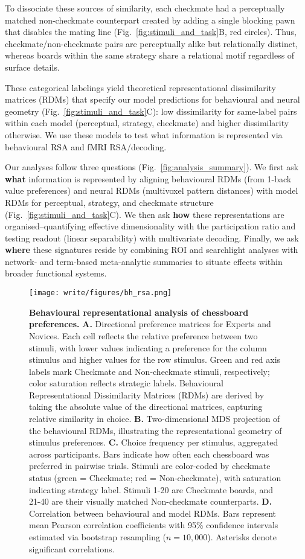 \documentclass[preprint,12pt]{elsarticle}
\begin{document}
To dissociate these sources of similarity, each checkmate had a perceptually matched non-checkmate counterpart created by adding a single blocking pawn that disables the mating line (Fig.~\ref{fig:stimuli_and_task}B, red circles). Thus, checkmate/non-checkmate pairs are perceptually alike but relationally distinct, whereas boards within the same strategy share a relational motif regardless of surface details.

These categorical labelings yield theoretical representational dissimilarity matrices (RDMs) that specify our model predictions for behavioural and neural geometry (Fig.~\ref{fig:stimuli_and_task}C): low dissimilarity for same-label pairs within each model (perceptual, strategy, checkmate) and higher dissimilarity otherwise. We use these models to test what information is represented via behavioural RSA and fMRI RSA/decoding.

Our analyses follow three questions (Fig.~\ref{fig:analysis_summary}). We first ask \textbf{what} information is represented by aligning behavioural RDMs (from 1-back value preferences) and neural RDMs (multivoxel pattern distances) with model RDMs for perceptual, strategy, and checkmate structure (Fig.~\ref{fig:stimuli_and_task}C). We then ask \textbf{how} these representations are organised--quantifying effective dimensionality with the participation ratio and testing readout (linear separability) with multivariate decoding. Finally, we ask \textbf{where} these signatures reside by combining ROI and searchlight analyses with network- and term-based meta-analytic summaries to situate effects within broader functional systems.

\begin{figure}[!htp]
  \centering
  \texttt{[image: write/figures/bh\_rsa.png]}
  \caption{ 
  \textbf{Behavioural representational analysis of chessboard preferences.} 
  \textbf{A.} Directional preference matrices for Experts and Novices. Each cell reflects the relative preference between two stimuli, with lower values indicating a preference for the column stimulus and higher values for the row stimulus. Green and red axis labels mark Checkmate and Non-checkmate stimuli, respectively; color saturation reflects strategic labels. Behavioural Representational Dissimilarity Matrices (RDMs) are derived by taking the absolute value of the directional matrices, capturing relative similarity in choice.
  \textbf{B.} Two-dimensional MDS projection of the behavioural RDMs, illustrating the representational geometry of stimulus preferences. 
  \textbf{C.} Choice frequency per stimulus, aggregated across participants. Bars indicate how often each chessboard was preferred in pairwise trials. Stimuli are color-coded by checkmate status (green = Checkmate; red = Non-checkmate), with saturation indicating strategy label. Stimuli 1-20 are Checkmate boards, and 21-40 are their visually matched Non-checkmate counterparts. 
  \textbf{D.} Correlation between behavioural and model RDMs. Bars represent mean Pearson correlation coefficients with 95\% confidence intervals estimated via bootstrap resampling ($n = 10{,}000$). Asterisks denote significant correlations.
  }
  \label{fig:bh_rsa}
\end{figure}
\end{document}
